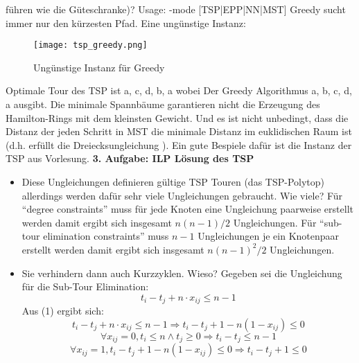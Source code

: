 \documentclass{article}
\begin{document}
\begin{flushleft}
führen wie die Güteschranke)?
\newline
Usage: -mode [TSP|EPP|NN|MST]
Greedy sucht immer nur den kürzesten Pfad. Eine ungünstige Instanz:
\newline
\begin{figure}[H]
    \centering
    \texttt{[image: tsp\_greedy.png]}
    \caption{Ungünstige Instanz für Greedy}
\end{figure}
Optimale Tour des TSP ist a, c, d, b, a wobei Der Greedy Algorithmus a, b, c, d, a ausgibt.
\newline
Die minimale Spannbäume garantieren nicht die Erzeugung des Hamilton-Rings mit dem kleinsten Gewicht.
Und es ist nicht unbedingt, dass die Distanz der jeden Schritt in MST die minimale Distanz im euklidischen Raum ist (d.h. erfüllt die Dreiecksungleichung ).
Ein gute Bespiele dafür ist die Instanz der TSP aus Vorlesung. 
\newline
\textbf{3. Aufgabe: ILP Lösung des TSP}
\begin{itemize}
    \item Diese Ungleichungen definieren gültige TSP Touren (das TSP-Polytop) allerdings werden dafür sehr viele
    Ungleichungen gebraucht. Wie viele?
    \newline
    Für ``degree constraints'' muss für jede Knoten eine Ungleichung paarweise erstellt werden damit ergibt sich insgesamt $n(n - 1)/2$ Ungleichungen.
    \newline
    Für ``sub-tour elimination constraints'' muss $n - 1$ Ungleichungen je ein Knotenpaar erstellt werden damit ergibt sich insgesamt $n(n - 1)^2 / 2$ Ungleichungen.
    \item Sie  verhindern dann auch Kurzzyklen. Wieso?
    \newline
    Gegeben sei die Ungleichung für die Sub-Tour Elimination:
    \begin{equation}
        t_i - t_j + n \cdot x_{ij} \leq n - 1
    \end{equation}
    Aus (1) ergibt sich:
    \begin{equation}
        t_i - t_j + n \cdot x_{ij} \leq n - 1 \Longrightarrow t_i - t_j + 1 - n(1 - x_{ij}) \leq 0
    \end{equation}
    \begin{equation}
        \forall x_{ij} = 0, t_i \leq n \land t_j \geq 0 \Longrightarrow t_i - t_j \leq n - 1
    \end{equation}
    \begin{equation}
        \forall x_{ij} = 1, t_i - t_j + 1 - n(1 - x_{ij}) \leq 0 \Longrightarrow t_i - t_j + 1 \leq 0

\end{equation}
\end{itemize}
\end{flushleft}
\end{document}
